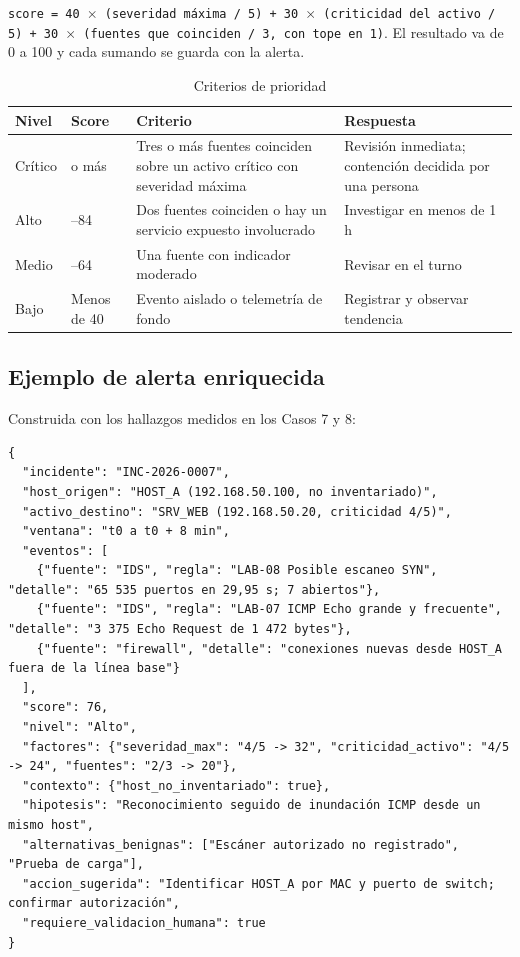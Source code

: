 \texttt{score = 40 $\times$ (severidad máxima / 5) + 30 $\times$ (criticidad del activo / 5) + 30 $\times$ (fuentes que coinciden / 3, con tope en 1)}. El resultado va de 0 a 100 y cada sumando se guarda con la alerta.

\begin{table}[H]
\centering
\small
\caption[Criterios de prioridad (tabla 1)]{Criterios de prioridad}
\begin{tabularx}{\linewidth}{>{\raggedright\arraybackslash}X >{\raggedright\arraybackslash}X >{\raggedright\arraybackslash}X >{\raggedright\arraybackslash}X}
\toprule
\textbf{Nivel} & \textbf{Score} & \textbf{Criterio} & \textbf{Respuesta} \\
\midrule
Crítico & 85 o más & Tres o más fuentes coinciden sobre un activo crítico con severidad máxima & Revisión inmediata; contención decidida por una persona \\
Alto & 65--84 & Dos fuentes coinciden o hay un servicio expuesto involucrado & Investigar en menos de 1 h \\
Medio & 40--64 & Una fuente con indicador moderado & Revisar en el turno \\
Bajo & Menos de 40 & Evento aislado o telemetría de fondo & Registrar y observar tendencia \\
\bottomrule
\end{tabularx}
\end{table}

\subsection{Ejemplo de alerta enriquecida}

Construida con los hallazgos medidos en los Casos 7 y 8:

\begin{lstlisting}
{
  "incidente": "INC-2026-0007",
  "host_origen": "HOST_A (192.168.50.100, no inventariado)",
  "activo_destino": "SRV_WEB (192.168.50.20, criticidad 4/5)",
  "ventana": "t0 a t0 + 8 min",
  "eventos": [
    {"fuente": "IDS", "regla": "LAB-08 Posible escaneo SYN", "detalle": "65 535 puertos en 29,95 s; 7 abiertos"},
    {"fuente": "IDS", "regla": "LAB-07 ICMP Echo grande y frecuente", "detalle": "3 375 Echo Request de 1 472 bytes"},
    {"fuente": "firewall", "detalle": "conexiones nuevas desde HOST_A fuera de la línea base"}
  ],
  "score": 76,
  "nivel": "Alto",
  "factores": {"severidad_max": "4/5 -> 32", "criticidad_activo": "4/5 -> 24", "fuentes": "2/3 -> 20"},
  "contexto": {"host_no_inventariado": true},
  "hipotesis": "Reconocimiento seguido de inundación ICMP desde un mismo host",
  "alternativas_benignas": ["Escáner autorizado no registrado", "Prueba de carga"],
  "accion_sugerida": "Identificar HOST_A por MAC y puerto de switch; confirmar autorización",
  "requiere_validacion_humana": true
}
\end{lstlisting}

